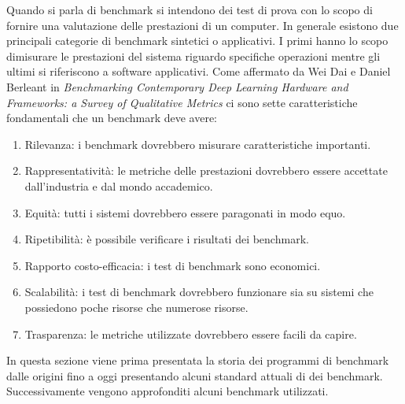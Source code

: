 \documentclass[12pt, a4paper]{report}
\begin{document}
Quando si parla di benchmark si intendono dei test di prova con lo scopo di fornire una valutazione delle prestazioni di un computer. In generale esistono due principali categorie di benchmark sintetici o applicativi. I primi hanno lo scopo dimisurare le prestazioni del sistema riguardo specifiche operazioni mentre gli ultimi si riferiscono a software applicativi. Come affermato da Wei Dai e Daniel Berleant in \textit{Benchmarking Contemporary Deep Learning Hardware and Frameworks: a Survey of Qualitative Metrics }\cite{benchmarkIntro} ci sono sette caratteristiche fondamentali che un benchmark deve avere:
\begin{enumerate}
 \item Rilevanza: i benchmark dovrebbero misurare caratteristiche importanti.
 \item Rappresentatività: le metriche delle prestazioni dovrebbero essere accettate dall'industria e dal mondo accademico.
 \item Equità: tutti i sistemi dovrebbero essere paragonati in modo equo.
 \item Ripetibilità: è possibile verificare i risultati dei benchmark.
 \item Rapporto costo-efficacia: i test di benchmark sono economici.
 \item Scalabilità: i test di benchmark dovrebbero funzionare sia su sistemi che possiedono poche risorse che numerose risorse.
 \item Trasparenza: le metriche utilizzate dovrebbero essere facili da capire.
\end{enumerate}
In questa sezione viene prima presentata la storia dei programmi di benchmark dalle origini fino a oggi presentando alcuni standard attuali di dei benchmark. Successivamente vengono approfonditi alcuni benchmark utilizzati.

 
\end{document}
